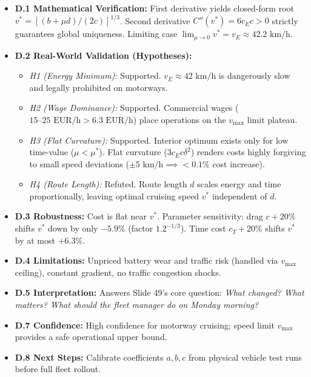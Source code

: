 \documentclass[17pt, a1paper, landscape, margin=10mm, innermargin=8mm, blockverticalspace=6mm, colspace=8mm]{tikzposter}
\begin{document}
\begin{columns}
{  \vspace{0.15em}
  \begin{itemize}
    \setlength{\itemsep}{2.5pt}
    \setlength{\parskip}{0pt}
    \item \textbf{D.1 Mathematical Verification:} First derivative yields closed-form root $v^* = [(b+\mu d)/(2c)]^{1/3}$. Second derivative $C''(v^*) = 6 c_E c > 0$ strictly guarantees global uniqueness. Limiting case $\lim_{\mu \to 0} v^* = v_E \approx 42.2\text{ km/h}$.
    \item \textbf{D.2 Real-World Validation (Hypotheses):}
      \begin{itemize}
        \setlength{\itemsep}{1pt}
        \item \textit{H1 (Energy Minimum):} Supported. $v_E \approx 42\text{ km/h}$ is dangerously slow and legally prohibited on motorways.
        \item \textit{H2 (Wage Dominance):} Supported. Commercial wages ($15\text{--}25\text{ EUR/h} > 6.3\text{ EUR/h}$) place operations on the $v_{\max}$ limit plateau.
        \item \textit{H3 (Flat Curvature):} Supported. Interior optimum exists only for low time-value ($\mu < \mu^*$). Flat curvature ($3 c_E c \delta^2$) renders costs highly forgiving to small speed deviations ($\pm 5\text{ km/h} \implies < 0.1\%$ cost increase).
        \item \textit{H4 (Route Length):} Refuted. Route length $d$ scales energy and time proportionally, leaving optimal cruising speed $v^*$ independent of $d$.
      \end{itemize}
    \item \textbf{D.3 Robustness:} Cost is flat near $v^*$. Parameter sensitivity: drag $c +20\%$ shifts $v^*$ down by only $-5.9\%$ (factor $1.2^{-1/3}$). Time cost $c_T +20\%$ shifts $v^*$ by at most $+6.3\%$.
    \item \textbf{D.4 Limitations:} Unpriced battery wear and traffic risk (handled via $v_{\max}$ ceiling), constant gradient, no traffic congestion shocks.
    \item \textbf{D.5 Interpretation:} Answers Slide 49's core question: \textit{What changed? What matters? What should the fleet manager do on Monday morning?}
    \item \textbf{D.7 Confidence:} High confidence for motorway cruising; speed limit $v_{\max}$ provides a safe operational upper bound.
    \item \textbf{D.8 Next Steps:} Calibrate coefficients $a,b,c$ from physical vehicle test runs before full fleet rollout.
  \end{itemize}

}
\end{columns}
\end{document}
